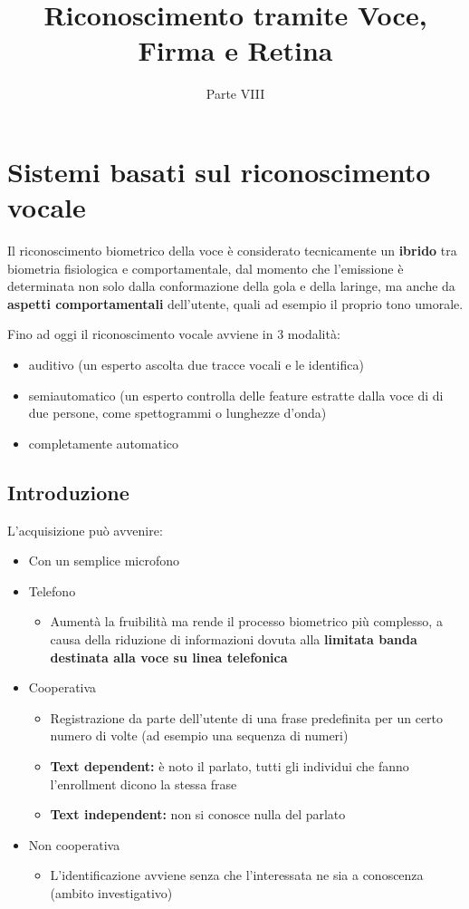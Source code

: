 \documentclass{report}
\title{Riconoscimento tramite Voce, Firma e Retina}
\date{Parte VIII}
\begin{document}
\maketitle

\tableofcontents
\newpage

\chapter{Sistemi basati sul riconoscimento vocale}

Il riconoscimento biometrico della voce è considerato tecnicamente un \textbf{ibrido} tra biometria fisiologica e
comportamentale, dal momento che l’emissione è determinata non solo dalla conformazione della gola e della
laringe, ma anche da \textbf{aspetti comportamentali} dell'utente, quali ad esempio il proprio tono umorale.

\noindent Fino ad oggi il riconoscimento vocale avviene in 3 modalità:
\begin{itemize}
    \item auditivo (un esperto ascolta due tracce vocali e le identifica)
    \item semiautomatico (un esperto controlla delle feature estratte dalla voce di 
    di due persone, come spettogrammi o lunghezze d'onda)
    \item completamente automatico
\end{itemize}


\section{Introduzione}

L'acquisizione può avvenire:
\begin{itemize}
    \item Con un semplice microfono
    \item Telefono
    \begin{itemize}
        \item Aumentà la fruibilità ma rende il processo biometrico più complesso, a causa 
        della riduzione di informazioni dovuta alla \textbf{limitata banda destinata alla voce su linea telefonica}
    \end{itemize}
    \item Cooperativa 
    \begin{itemize}
        \item Registrazione da parte dell'utente di una frase predefinita per un certo numero di volte (ad esempio una sequenza di numeri)
        \item \textbf{Text dependent:} è noto il parlato, tutti gli individui che fanno l'enrollment dicono la stessa frase 
        \item \textbf{Text independent:} non si conosce nulla del parlato 
    \end{itemize}
    \item Non cooperativa 
    \begin{itemize}
        \item L'identificazione avviene senza che l'interessata ne sia a conoscenza (ambito investigativo)
    \end{itemize}
\end{itemize}
\end{document}
